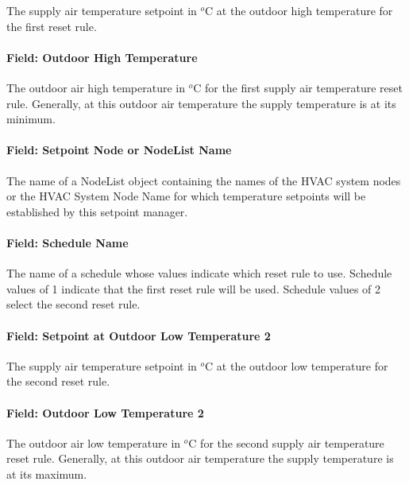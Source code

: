 The supply air temperature setpoint in \(^{o}\)C at the outdoor high temperature for the first reset rule.

\paragraph{Field: Outdoor High Temperature}\label{field-outdoor-high-temperature}

The outdoor air high temperature in \(^{o}\)C for the first supply air temperature reset rule. Generally, at this outdoor air temperature the supply temperature is at its minimum.

\paragraph{Field: Setpoint Node or NodeList Name}\label{field-setpoint-node-or-nodelist-name-2}

The name of a NodeList object containing the names of the HVAC system nodes or the HVAC System Node Name for which temperature setpoints will be established by this setpoint manager.

\paragraph{Field: Schedule Name}\label{field-schedule-name-1-002}

The name of a schedule whose values indicate which reset rule to use. Schedule values of 1 indicate that the first reset rule will be used. Schedule values of 2 select the second reset rule.

\paragraph{Field: Setpoint at Outdoor Low Temperature 2}\label{field-setpoint-at-outdoor-low-temperature-2}

The supply air temperature setpoint in \(^{o}\)C at the outdoor low temperature for the second reset rule.

\paragraph{Field: Outdoor Low Temperature 2}\label{field-outdoor-low-temperature-2}

The outdoor air low temperature in \(^{o}\)C for the second supply air temperature reset rule. Generally, at this outdoor air temperature the supply temperature is at its maximum.

